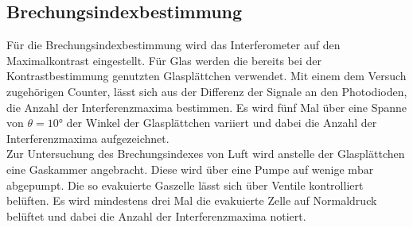 \subsection{Brechungsindexbestimmung}
Für die Brechungsindexbestimmung wird das Interferometer auf den Maximalkontrast eingestellt. Für Glas werden die bereits bei der Kontrastbestimmung genutzten Glasplättchen verwendet.
Mit einem dem Versuch zugehörigen Counter, lässt sich aus der Differenz der Signale an den Photodioden, die Anzahl der Interferenzmaxima bestimmen. Es wird fünf Mal über eine Spanne von $\theta = 10°$ der Winkel der Glasplättchen
variiert und dabei die Anzahl der Interferenzmaxima aufgezeichnet.\\
Zur Untersuchung des Brechungsindexes von Luft wird anstelle der Glasplättchen eine Gaskammer angebracht. Diese wird über eine Pumpe auf wenige $\si{\milli\bar}$ abgepumpt. Die so evakuierte Gaszelle lässt sich
über Ventile kontrolliert belüften. Es wird mindestens drei Mal die evakuierte Zelle auf Normaldruck belüftet und dabei die Anzahl der Interferenzmaxima notiert.
